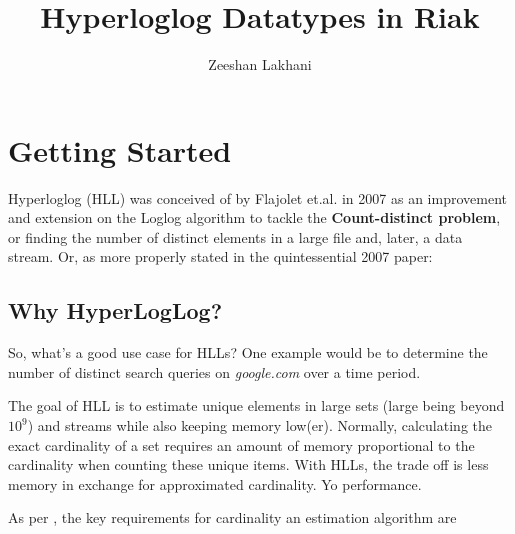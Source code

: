 \documentclass[12pt]{article}
\newlength\tindent
\renewcommand{\indent}{\hspace*{\tindent}}
\begin{document}
\title{Hyperloglog Datatypes in Riak}
\author{Zeeshan Lakhani}

\maketitle

\section{Getting Started}

Hyperloglog (HLL) was conceived of by
Flajolet et.al.\cite{Flatjolet:2007:Online} in 2007 as an improvement and
extension on the Loglog\cite{Durand:2003:Online} algorithm to tackle the
\textbf{Count-distinct problem}\cite{Count-distinct:Online}, or finding the
number of distinct elements in a large file and, later, a data stream.
Or, as more properly stated in the quintessential 2007 paper:\newline


\subsection{Why HyperLogLog?}

So, what's a good use case for HLLs? One example would be to determine the
number of distinct search queries on \textit{google.com} over a time
period\cite{Heule:2013:Online}.

\indent The goal of HLL is to estimate unique elements in large sets (large being beyond
$10^{9}$) and streams while also keeping memory low(er). Normally, calculating
the exact cardinality of a set requires an amount of memory proportional to the
cardinality when counting these unique items. With HLLs, the trade off is less
memory in exchange for approximated cardinality. Yo performance.\newline

As per \cite{Heule:2013:Online}, the key requirements for cardinality an
estimation algorithm are
\end{document}
